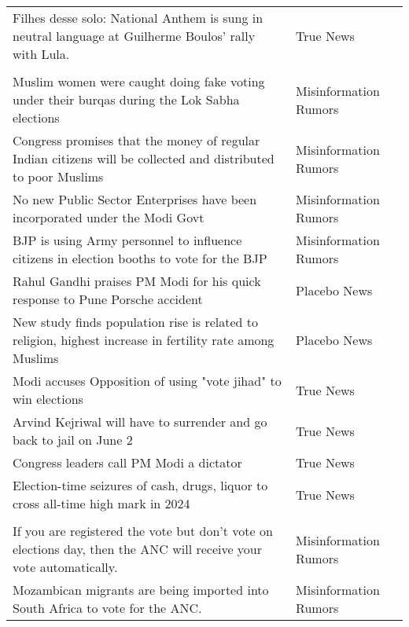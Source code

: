 \begin{table}[H]
{\begin{tabular}[t]{>{\raggedright\arraybackslash}p{10cm}l}
\hspace{1em}Filhes desse solo: National Anthem is sung in neutral language at Guilherme Boulos' rally with Lula. & True News\\
\addlinespace[0.3em]
\multicolumn{2}{l}{\textbf{India}}\\
\hspace{1em}Muslim women were caught doing fake voting under their burqas during the Lok Sabha elections & Misinformation Rumors\\
\hspace{1em}Congress promises that the money of regular Indian citizens will be collected and distributed to poor Muslims & Misinformation Rumors\\
\hspace{1em}No new Public Sector Enterprises have been incorporated under the Modi Govt & Misinformation Rumors\\
\hspace{1em}BJP is using Army personnel to influence citizens in election booths to vote for the BJP & Misinformation Rumors\\
\hspace{1em}Rahul Gandhi praises PM Modi for his quick response to Pune Porsche accident & Placebo News\\
\hspace{1em}New study finds population rise is related to religion, highest increase in fertility rate among Muslims & Placebo News\\
\hspace{1em}Modi accuses Opposition of using "vote jihad" to win elections & True News\\
\hspace{1em}Arvind Kejriwal will have to surrender and go back to jail on June 2 & True News\\
\hspace{1em}Congress leaders call PM Modi a dictator & True News\\
\hspace{1em}Election-time seizures of cash, drugs, liquor to cross all-time high mark in 2024 & True News\\
\addlinespace[0.3em]
\multicolumn{2}{l}{\textbf{South Africa}}\\
\hspace{1em}If you are registered the vote but don't vote on elections day, then the ANC will receive your vote automatically. & Misinformation Rumors\\
\hspace{1em}Mozambican migrants are being imported into South Africa to vote for the ANC. & Misinformation Rumors\\

\end{tabular}}
\end{table}
